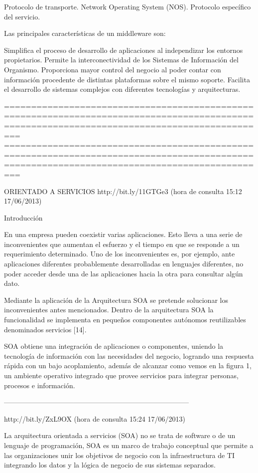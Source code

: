     Protocolo de transporte.
    Network Operating System (NOS).
    Protocolo específico del servicio.

Las principales características de un middleware son:

    Simplifica el proceso de desarrollo de aplicaciones al independizar los entornos propietarios.
    Permite la interconectividad de los Sistemas de Información del Organismo.
    Proporciona mayor control del negocio al poder contar con información procedente de distintas plataformas sobre el mismo soporte.
    Facilita el desarrollo de sistemas complejos con diferentes tecnologías y arquitecturas.

=============================================================================================================================================
=============================================================================================================================================

ORIENTADO A SERVICIOS
http://bit.ly/11GTGe3 (hora de consulta 15:12 17/06/2013)

Introducción   

En una empresa pueden coexistir varias aplicaciones. Esto lleva a una serie de inconvenientes que aumentan el esfuerzo y el tiempo en 
que se responde a un requerimiento determinado. Uno de los inconvenientes es, por ejemplo, ante aplicaciones diferentes probablemente 
desarrolladas en lenguajes diferentes, no poder acceder desde una de las aplicaciones hacia la otra para consultar algún dato.

Mediante la aplicación de la Arquitectura SOA se pretende solucionar los inconvenientes antes mencionados. Dentro de la arquitectura 
SOA la funcionalidad se implementa en pequeños componentes autónomos reutilizables denominados servicios [14].

SOA obtiene una integración de aplicaciones o componentes, uniendo la tecnología de información con las necesidades del negocio, 
logrando una respuesta rápida con un bajo acoplamiento, además de alcanzar como vemos en la figura 1, un ambiente operativo integrado 
que provee servicios para integrar personas, procesos e información.

--------------------------------------------------------------------------------

http://bit.ly/ZxL9OX (hora de consulta 15:24 17/06/2013)

La arquitectura orientada a servicios (SOA) no se trata de software o de un lenguaje de programación, SOA es un marco de trabajo 
conceptual que permite a las organizaciones unir los objetivos de negocio con la infraestructura de TI integrando los datos y la 
lógica de negocio de sus sistemas separados.

